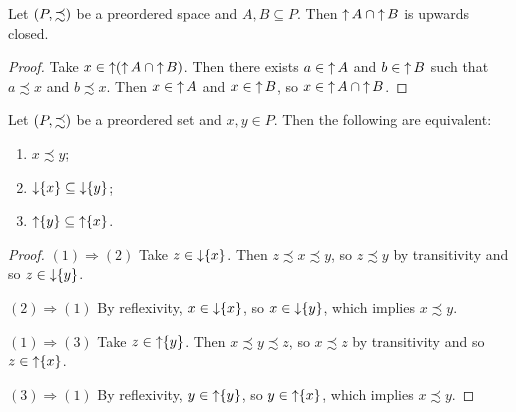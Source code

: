 \begin{lemma} \label{intersectionUpwardsClosedIsUpwardsClosed}
Let $\sSet{P, \precsim}$ be a preordered space and $A,B\subseteq P$. Then $\operatorname{\uparrow} A \cap \operatorname{\uparrow} B$ is upwards closed.
\end{lemma}
\begin{proof}
Take $x\in \operatorname{\uparrow}(\operatorname{\uparrow} A \cap \operatorname{\uparrow} B)$. Then there exists $a\in \operatorname{\uparrow} A$ and $b\in \operatorname{\uparrow} B$ such that $a\precsim x$ and $b\precsim x$. Then $x\in \operatorname{\uparrow} A$ and $x\in \operatorname{\uparrow} B$, so $x\in \operatorname{\uparrow} A \cap \operatorname{\uparrow} B$.
\end{proof}

\begin{lemma} \label{principalDownSetEmbedding}
Let $\sSet{P,\precsim}$ be a preordered set and $x,y\in P$. Then the following are equivalent:
\begin{enumerate}
\item $x \precsim y$;
\item $\operatorname{\downarrow} \{x\} \subseteq \operatorname{\downarrow} \{y\}$;
\item $\operatorname{\uparrow} \{y\} \subseteq \operatorname{\uparrow} \{x\}$.
\end{enumerate}
\end{lemma}
\begin{proof}
$(1) \Rightarrow (2)$ Take $z\in \operatorname{\downarrow}\{x\}$. Then $z \precsim x\precsim y$, so $z\precsim y$ by transitivity and so $z\in \operatorname{\downarrow}\{y\}$.

$(2) \Rightarrow (1)$ By reflexivity, $x\in \operatorname{\downarrow}\{x\}$, so $x\in \operatorname{\downarrow}\{y\}$, which implies $x\precsim y$.

$(1) \Rightarrow (3)$ Take $z\in \operatorname{\uparrow}\{y\}$. Then $x\precsim y \precsim z$, so $x\precsim z$ by transitivity and so $z\in \operatorname{\uparrow}\{x\}$.

$(3) \Rightarrow (1)$ By reflexivity, $y\in \operatorname{\uparrow}\{y\}$, so $y\in \operatorname{\uparrow}\{x\}$, which implies $x\precsim y$.
\end{proof}

